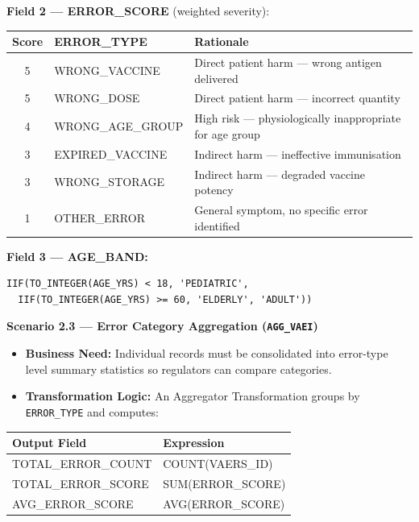\documentclass[12pt,a4paper]{report}
\begin{document}
\medskip\textbf{Field 2 — ERROR\_SCORE} (weighted severity):

\begin{center}
\begin{tabular}{clp{6cm}}
\toprule
\textbf{Score} & \textbf{ERROR\_TYPE}   & \textbf{Rationale} \\
\midrule
5 & WRONG\_VACCINE    & Direct patient harm — wrong antigen delivered \\
5 & WRONG\_DOSE       & Direct patient harm — incorrect quantity \\
4 & WRONG\_AGE\_GROUP & High risk — physiologically inappropriate for age group \\
3 & EXPIRED\_VACCINE  & Indirect harm — ineffective immunisation \\
3 & WRONG\_STORAGE    & Indirect harm — degraded vaccine potency \\
1 & OTHER\_ERROR      & General symptom, no specific error identified \\
\bottomrule
\end{tabular}
\end{center}

\medskip\textbf{Field 3 — AGE\_BAND:}
\begin{lstlisting}
IIF(TO_INTEGER(AGE_YRS) < 18, 'PEDIATRIC',
  IIF(TO_INTEGER(AGE_YRS) >= 60, 'ELDERLY', 'ADULT'))
\end{lstlisting}

\bigskip

\noindent\textbf{Scenario 2.3 — Error Category Aggregation (\texttt{AGG\_VAEI})}

\begin{itemize}[leftmargin=*]
  \item \textbf{Business Need:} Individual records must be consolidated into error-type level summary statistics so regulators can compare categories.
  \item \textbf{Transformation Logic:} An Aggregator Transformation groups by \texttt{ERROR\_TYPE} and computes:
\end{itemize}

\begin{center}
\begin{tabular}{ll}
\toprule
\textbf{Output Field}      & \textbf{Expression}   \\
\midrule
TOTAL\_ERROR\_COUNT & COUNT(VAERS\_ID)  \\
TOTAL\_ERROR\_SCORE & SUM(ERROR\_SCORE) \\
AVG\_ERROR\_SCORE   & AVG(ERROR\_SCORE) \\
\bottomrule
\end{tabular}
\end{center}
\end{document}
